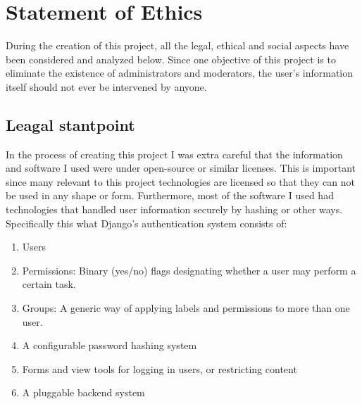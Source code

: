 
\chapter {Statement of Ethics}
During the creation of this project, all the legal, ethical and social aspects have been considered and analyzed below. Since one objective of this project is to eliminate the existence of administrators and moderators, the user's information itself should not ever be intervened by anyone.

\section{Leagal stantpoint}
In the process of creating this project I was extra careful that the information and software I used were under open-source or similar licenses. This is important since many relevant to this project technologies are licensed so that they can not be used in any shape or form. Furthermore, most of the software I used had technologies that handled user information securely by hashing or other ways. Specifically this what Django's authentication system consists of:

\begin{enumerate}
  \item Users
  \item Permissions: Binary (yes/no) flags designating whether a user may perform a certain task.
  \item Groups: A generic way of applying labels and permissions to more than one user.
  \item A configurable password hashing system
  \item Forms and view tools for logging in users, or restricting content
  \item A pluggable backend system
\end{enumerate}
